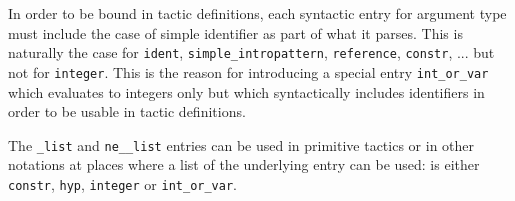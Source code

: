 \Rem In order to be bound in tactic definitions, each syntactic entry
for argument type must include the case of simple {\ltac} identifier
as part of what it parses. This is naturally the case for {\tt ident},
{\tt simple\_intropattern}, {\tt reference}, {\tt constr}, ... but not
for {\tt integer}. This is the reason for introducing a special entry
{\tt int\_or\_var} which evaluates to integers only but which
syntactically includes identifiers in order to be usable in tactic
definitions.

\Rem The {\tt {}\_list} and {\tt ne\_{}\_list}
entries can be used in primitive tactics or in other notations at
places where a list of the underlying entry can be used: {} is
either {\tt\small constr}, {\tt\small hyp}, {\tt\small integer} or
{\tt\small int\_or\_var}.



